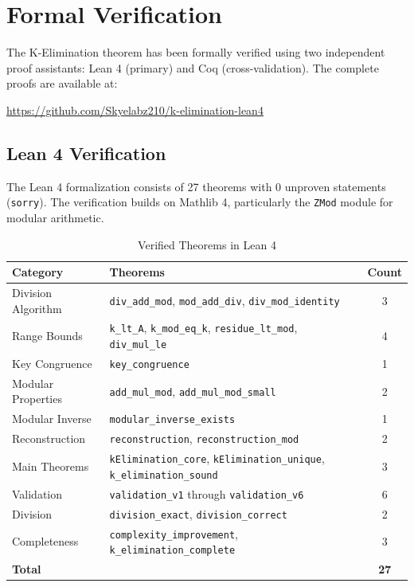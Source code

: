 \documentclass[11pt,a4paper]{article}
\begin{document}
\section{Formal Verification}

The K-Elimination theorem has been formally verified using two independent proof assistants: Lean 4 (primary) and Coq (cross-validation). The complete proofs are available at:

\begin{center}
\url{https://github.com/Skyelabz210/k-elimination-lean4}
\end{center}

\subsection{Lean 4 Verification}

The Lean 4 formalization consists of 27 theorems with 0 unproven statements (\texttt{sorry}). The verification builds on Mathlib 4, particularly the \texttt{ZMod} module for modular arithmetic.

\begin{table}[h]
\centering
\caption{Verified Theorems in Lean 4}
\begin{tabular}{@{}llc@{}}
\toprule
\textbf{Category} & \textbf{Theorems} & \textbf{Count} \\
\midrule
Division Algorithm & \texttt{div\_add\_mod}, \texttt{mod\_add\_div}, \texttt{div\_mod\_identity} & 3 \\
Range Bounds & \texttt{k\_lt\_A}, \texttt{k\_mod\_eq\_k}, \texttt{residue\_lt\_mod}, \texttt{div\_mul\_le} & 4 \\
Key Congruence & \texttt{key\_congruence} & 1 \\
Modular Properties & \texttt{add\_mul\_mod}, \texttt{add\_mul\_mod\_small} & 2 \\
Modular Inverse & \texttt{modular\_inverse\_exists} & 1 \\
Reconstruction & \texttt{reconstruction}, \texttt{reconstruction\_mod} & 2 \\
Main Theorems & \texttt{kElimination\_core}, \texttt{kElimination\_unique}, \texttt{k\_elimination\_sound} & 3 \\
Validation & \texttt{validation\_v1} through \texttt{validation\_v6} & 6 \\
Division & \texttt{division\_exact}, \texttt{division\_correct} & 2 \\
Completeness & \texttt{complexity\_improvement}, \texttt{k\_elimination\_complete} & 3 \\
\midrule
\textbf{Total} & & \textbf{27} \\
\bottomrule
\end{tabular}
\end{table}
\end{document}
